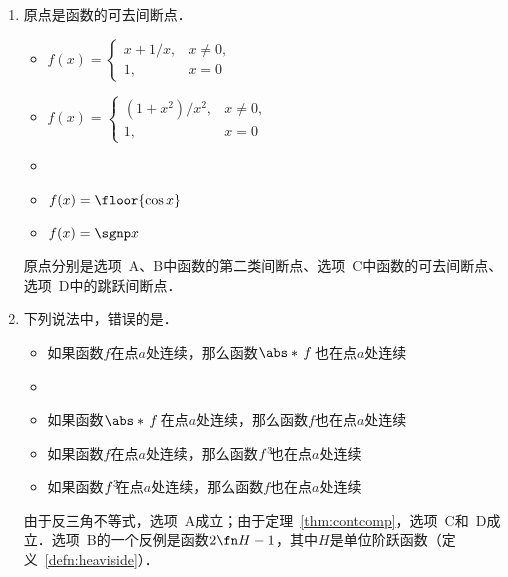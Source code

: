 \begin{enumerate}
\item 原点是函数\uline{\makebox[6em]{}}的可去间断点．
  \begin{itemize}
    \renewcommand{\labelitemi}{\faCircleThin}
  \item
    \begin{math}
      f(x) =
      \begin{cases}
        x + 1/x, & x \ne 0, \\
        1, & x = 0
      \end{cases}
    \end{math}
  \item
    \begin{math}
      f(x) =
      \begin{cases}
        (1+x^2)/x^2, & x \ne 0, \\
        1, & x = 0
      \end{cases}
    \end{math}
    \ifshowsol
  \item[\faCircle]
    \else
  \item
    \fi
    \(f(x) = \floor{\cos x}\)
  \item \(f(x) = \sgnp x\)
  \end{itemize}

  \ifshowsol
  原点分别是选项~A、B中函数的第二类间断点、选项~C中函数的可去间断点、选项~D中的跳跃间断点．
  \fi

\item 下列说法中，错误的是\uline{\makebox[10em]{}}．
  \begin{itemize}
    \renewcommand{\labelitemi}{\faCircleThin}
  \item 如果函数\(f\)在点\(a\)处连续，那么函数\(\abs*{\,f\,}\)也在点\(a\)处连续
    \ifshowsol
  \item[\faCircle]
    \else
  \item
    \fi
    如果函数\(\abs*{\,f\,}\)在点\(a\)处连续，那么函数\(f\)也在点\(a\)处连续
  \item 如果函数\(f\)在点\(a\)处连续，那么函数\(f^3\negthickspace\)也在点\(a\)处连续
  \item 如果函数\(f^3\negthickspace\)在点\(a\)处连续，那么函数\(f\)也在点\(a\)处连续
  \end{itemize}

  \ifshowsol
  由于反三角不等式，选项~A成立；由于定理~\ref{thm:contcomp}，选项~C和~D成立．选项~B的一个反例是函数\(2\fn H - 1\)，其中\(H\)是单位阶跃函数（定义~\ref{defn:heaviside}）．
  \fi


\end{enumerate}
